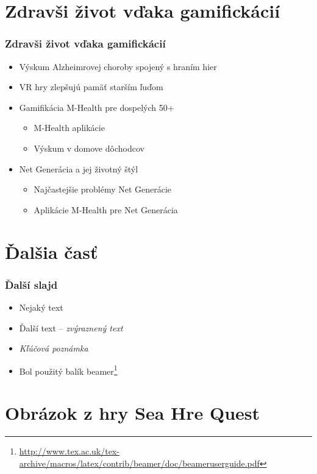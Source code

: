 \documentclass{beamer}
\newcommand{\footcite}[1]{\footnote{\tiny #1}}
\newcommand{\emp}[1]{\textit{\alert{#1}}}
\newcommand{\ssection}[1]{
	\section{#1}
	\begin{frame}[fragile=singleslide]\frametitle{}
	\Huge #1
	\end{frame}
}
\begin{document}
\section{Zdravši život vďaka gamifickácií}

\begin{frame}[fragile=singleslide]\frametitle{Zdravši život vďaka gamifickácií}
\begin{itemize}
\item Výskum Alzheimrovej choroby spojený s hraním hier
\item VR hry zlepšujú pamäť starším ľuďom
\item Gamifikácia M-Health pre dospelých 50+
	\begin{itemize}
	\item M-Health aplikácie 
	\item Výskum v domove dôchodcov
	\end{itemize}
\item Net Generácia a jej životný štýl
	\begin{itemize}
	\item Najčastejšie problémy Net Generácie
	\item Aplikácie M-Health pre Net Generácia 
	\end{itemize}
\end{itemize}
\end{frame}

\section{Ďalšia časť}

\begin{frame}[fragile=singleslide]\frametitle{Ďalší slajd}
\begin{itemize}
\item Nejaký text
\item Ďalší text -- \emph{zvýraznený text}
\item \emp{Kľúčová poznámka} %

\item Bol použitý balík beamer\footcite{\url{http://www.tex.ac.uk/tex-archive/macros/latex/contrib/beamer/doc/beameruserguide.pdf}}
\end{itemize}
\end{frame}

\section{Obrázok z hry Sea Hre Quest}
\end{document}
